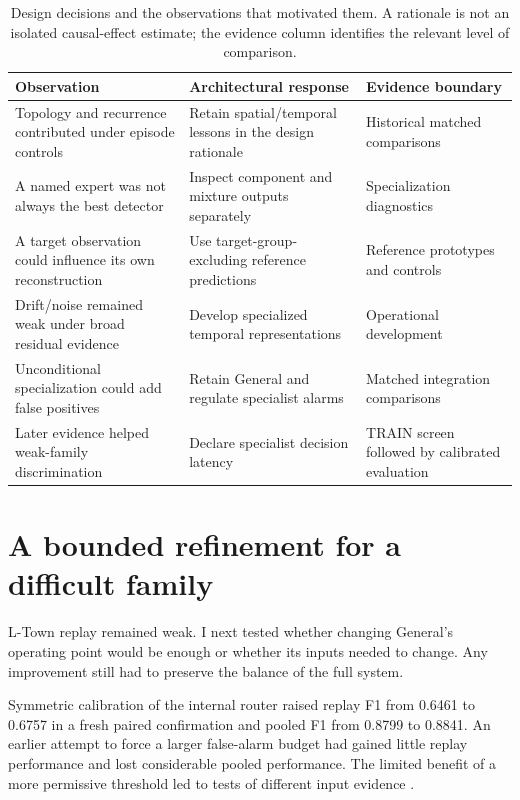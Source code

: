 \begin{table}[tbp]
\centering\small
\caption[Design decisions and the observations that motivated them]{Design decisions and the observations that motivated them. A rationale is not an isolated causal-effect estimate; the evidence column identifies the relevant level of comparison.}
\label{tab:decisions}
\begin{tabularx}{\linewidth}{@{}YYY@{}}
\toprule
Observation & Architectural response & Evidence boundary\\
\midrule
Topology and recurrence contributed under episode controls & Retain spatial/temporal lessons in the design rationale & Historical matched comparisons\\
A named expert was not always the best detector & Inspect component and mixture outputs separately & Specialization diagnostics\\
A target observation could influence its own reconstruction & Use target-group-excluding reference predictions & Reference prototypes and controls\\
Drift/noise remained weak under broad residual evidence & Develop specialized temporal representations & Operational development\\
Unconditional specialization could add false positives & Retain General and regulate specialist alarms & Matched integration comparisons\\
Later evidence helped weak-family discrimination & Declare specialist decision latency & TRAIN screen followed by calibrated evaluation\\
\bottomrule
\end{tabularx}
\end{table}

\section{A bounded refinement for a difficult family}
L-Town replay remained weak. I next tested whether changing General's operating point would be enough or whether its inputs needed to change. Any improvement still had to preserve the balance of the full system.

Symmetric calibration of the internal router raised replay F1 from 0.6461 to 0.6757 in a fresh paired confirmation and pooled F1 from 0.8799 to 0.8841. An earlier attempt to force a larger false-alarm budget had gained little replay performance and lost considerable pooled performance. The limited benefit of a more permissive threshold led to tests of different input evidence \cite{projectrouter}.

